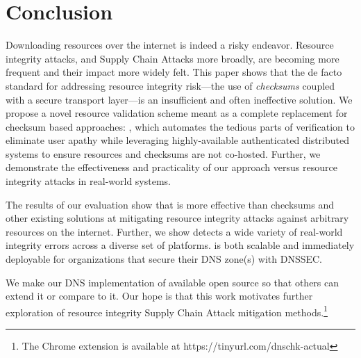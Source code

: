 \section{Conclusion} \label{sec:conclusion}

Downloading resources over the internet is indeed a risky endeavor. Resource
integrity attacks, and Supply Chain Attacks more broadly, are becoming more
frequent and their impact more widely felt. This paper shows that the de facto
standard for addressing resource integrity risk---the use of \emph{checksums}
coupled with a secure transport layer---is an insufficient and often ineffective
solution. We propose a novel resource validation scheme meant as a complete
replacement for checksum based approaches: \SYSTEM{}, which automates the
tedious parts of verification to eliminate user apathy while leveraging
highly-available authenticated distributed systems to ensure resources and
checksums are not co-hosted. Further, we demonstrate the effectiveness and
practicality of our approach versus resource integrity attacks in real-world
systems.

The results of our evaluation show that \SYSTEM{} is more effective than
checksums and other existing solutions at mitigating resource integrity attacks
against arbitrary resources on the internet. Further, we show \SYSTEM{} detects
a wide variety of real-world integrity errors across a diverse set of platforms.
\SYSTEM{} is both scalable and immediately deployable for organizations that
secure their DNS zone(s) with DNSSEC.

We make our DNS implementation of \SYSTEM{} available open source so that others
can extend it or compare to it. Our hope is that this work motivates further
exploration of resource integrity Supply Chain Attack mitigation
methods.\footnote{The \SYSTEM{} Chrome extension is available at
https://tinyurl.com/dnschk-actual}
